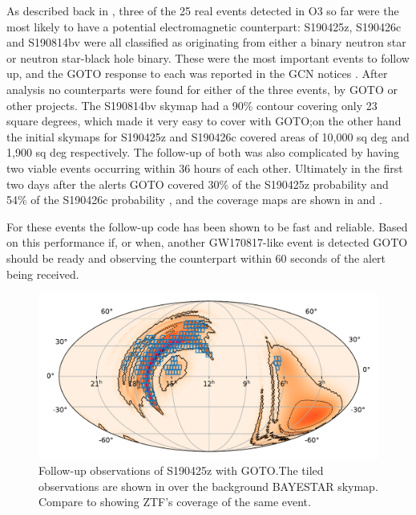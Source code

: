 \begin{colsection}
\begin{colsection}
As described back in , three of the 25 real events detected in O3 so far were the most likely to have a potential electromagnetic counterpart: S190425z, S190426c and S190814bv were all classified as originating from either a binary neutron star or neutron star-black hole binary. These were the most important events to follow up, and the GOTO response to each was reported in the GCN notices \citet{GW190425_GOTO, GW190426_GOTO, GW190814_GOTO}. After analysis no counterparts were found for either of the three events, by GOTO or other projects. The S190814bv skymap had a 90\% contour covering only 23 square degrees, which made it very easy to cover with GOTO;\@ on the other hand the initial skymaps for S190425z and S190426c covered areas of 10,000 sq deg and 1,900 sq deg respectively. The follow-up of both was also complicated by having two viable events occurring within 36 hours of each other. Ultimately in the first two days after the alerts GOTO covered 30\% of the S190425z probability \citep{GW190425_GOTO} and 54\% of the S190426c probability \citep{GW190426_GOTO}, and the coverage maps are shown in  and .

For these events the follow-up code has been shown to be fast and reliable. Based on this performance if, or when, another GW170817-like event is detected GOTO should be ready and observing the counterpart within 60 seconds of the alert being received.

\begin{figure}[p]
    \begin{center}
        \includegraphics[width=0.9\linewidth]{images/190425_goto.pdf}
    \end{center}
    \caption[Follow-up observations of S190425z with GOTO]{
        Follow-up observations of S190425z with GOTO.\@ The tiled observations are shown in  over the background BAYESTAR skymap. Compare to  showing ZTF's coverage of the same event.
        }\label{fig:190425_goto}
\end{figure}


\end{colsection}
\end{colsection}

